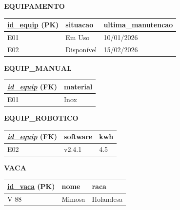 \documentclass[12pt]{article}
\begin{document}
\begin{table}[H]
    \vspace{0.6cm}

    \textbf{EQUIPAMENTO}\\
    \begin{tabular}{|l|l|l|}
    \hline
    \rowcolor{tableheader} \underline{id\_equip} (PK) & situacao & ultima\_manutencao \\ \hline
    E01 & Em Uso & 10/01/2026 \\ \hline
    E02 & Disponível & 15/02/2026 \\ \hline
    \end{tabular}

    \vspace{0.4cm}

    \begin{minipage}{0.45\textwidth}
        \centering
        \textbf{EQUIP\_MANUAL}\\
        \begin{tabular}{|l|l|}
        \hline
        \rowcolor{tableheader} \underline{\textit{id\_equip}} (FK) & material \\ \hline
        E01 & Inox \\ \hline
        \end{tabular}
    \end{minipage}
    \begin{minipage}{0.45\textwidth}
        \centering
        \textbf{EQUIP\_ROBOTICO}\\
        \begin{tabular}{|l|l|l|}
        \hline
        \rowcolor{tableheader} \underline{\textit{id\_equip}} (FK) & software & kwh \\ \hline
        E02 & v2.4.1 & 4.5 \\ \hline
        \end{tabular}
    \end{minipage}

    \vspace{0.6cm}

    \textbf{VACA}\\
    \begin{tabular}{|l|l|l|}
    \hline
    \rowcolor{tableheader} \underline{id\_vaca} (PK) & nome & raca \\ \hline
    V-88 & Mimosa & Holandesa \\ \hline
    \end{tabular}

    \vspace{0.4cm}


\end{table}
\end{document}
